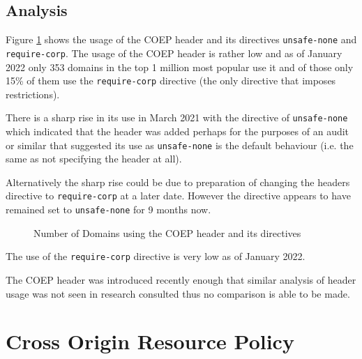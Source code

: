 \documentclass{mscreport}
\begin{document}
\subsection{Analysis}


\noindent
Figure \ref{fig:coep_overview} shows the usage of the COEP header and its directives \texttt{unsafe-none} and \texttt{require-corp}. The usage of the COEP header is rather low and as of January 2022 only 353 domains in the top 1 million most popular use it and of those only 15\% of them use the \texttt{require-corp} directive (the only directive that imposes restrictions).


\vspace{0.3cm} \noindent
There is a sharp rise in its use in March 2021 with the directive of \texttt{unsafe-none} which indicated that the header was added perhaps for the purposes of an audit or similar that suggested its use as \texttt{unsafe-none} is the default behaviour (i.e. the same as not specifying the header at all).

\vspace{0.3cm} \noindent
Alternatively the sharp rise could be due to preparation of changing the headers directive to \texttt{require-corp} at a later date. However the directive appears to have remained set to \texttt{unsafe-none} for 9 months now.

\newpage


\begin{figure}[t]
	\begin{center}
		\caption{Number of Domains using the COEP header and its directives}
		\label{fig:coep_overview}
	\end{center}
\end{figure}


\vspace{0.3cm} \noindent
The use of the \texttt{require-corp} directive is very low as of January 2022.

\vspace{0.3cm} \noindent
The COEP header was introduced recently enough that similar analysis of header usage was not seen in research consulted thus no comparison is able to be made.

\clearpage
\newpage


\section{Cross Origin Resource Policy}
\label{section:ana_corp}
\end{document}
